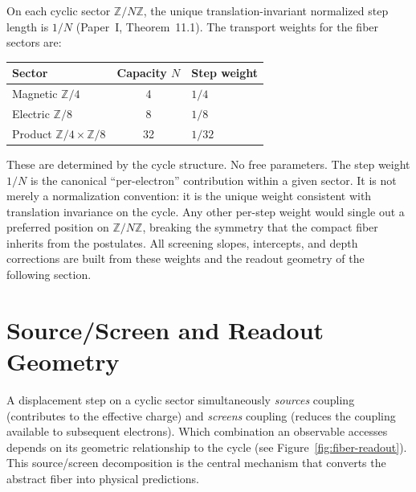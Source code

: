 \documentclass[11pt,a4paper]{article}
\begin{document}
On each cyclic sector $\mathbb{Z}/N\mathbb{Z}$, the unique translation-invariant normalized step length is $1/N$ (Paper~I, Theorem~11.1). The transport weights for the fiber sectors are:

\begin{center}
\begin{tabular}{lcl}
\toprule
Sector & Capacity $N$ & Step weight \\
\midrule
Magnetic $\mathbb{Z}/4$ & 4 & $1/4$ \\
Electric $\mathbb{Z}/8$ & 8 & $1/8$ \\
Product $\mathbb{Z}/4 \times \mathbb{Z}/8$ & 32 & $1/32$ \\
\bottomrule
\end{tabular}
\end{center}

These are determined by the cycle structure. No free parameters. The step weight $1/N$ is the canonical ``per-electron'' contribution within a given sector. It is not merely a normalization convention: it is the unique weight consistent with translation invariance on the cycle. Any other per-step weight would single out a preferred position on $\mathbb{Z}/N\mathbb{Z}$, breaking the symmetry that the compact fiber inherits from the postulates. All screening slopes, intercepts, and depth corrections are built from these weights and the readout geometry of the following section.

\section{Source/Screen and Readout Geometry}
\label{sec:readout}

A displacement step on a cyclic sector simultaneously \emph{sources} coupling (contributes to the effective charge) and \emph{screens} coupling (reduces the coupling available to subsequent electrons). Which combination an observable accesses depends on its geometric relationship to the cycle (see Figure~\ref{fig:fiber-readout}). This source/screen decomposition is the central mechanism that converts the abstract fiber into physical predictions.
\end{document}
